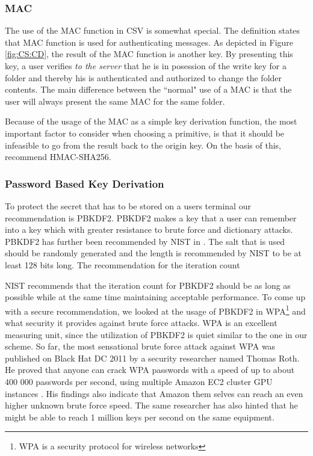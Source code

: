 \documentclass[pdftex,english,10pt,b5paper,twoside]{book}
\begin{document}
\subsubsection{\ac{MAC}}
The use of the \ac{MAC} function in \ac{CSV} is somewhat special. The
definition states that MAC function is used for authenticating messages.  As
depicted in Figure \ref{fig:CS:CD}, the result of the \ac{MAC} function is
another key. By presenting this key, a user verifies \emph{to the server} that
he is in posession of the write key for a folder and thereby his is
authenticated and authorized to change the folder contents. The main difference
between the ``normal" use of a \ac{MAC} is that the user will always present
the same \ac{MAC} for the same folder.

Because of the usage of the \ac{MAC} as a simple key derivation function, the
most important factor to consider when choosing a primitive, is that it should
be infeasible to go from the result back to the origin key. On the basis of
this, \citet{schneier} recommend HMAC-SHA256.

\subsubsection{Password Based Key Derivation} 

To protect the secret that has to be stored on a users terminal our
recommendation is \ac{PBKDF2}. \ac{PBKDF2} makes a key that a user can remember
into a key which with greater resistance to brute force and dictionary attacks.
\ac{PBKDF2} has further been recommended by \ac{NIST} in \cite{pbkdf_nist}.
The salt that is used should be randomly generated and the length is
recommended by \ac{NIST} to be at least 128 bits long. The recommendation for
the iteration count 

\ac{NIST} recommends that the iteration count for \ac{PBKDF2} should be as long
as possible while at the same time maintaining acceptable
performance\cite{pbkdf_nist}. To come up with a secure recommendation, we
looked at the usage of \ac{PBKDF2} in WPA\footnote{WPA is a security protocol
for wireless networks} and what security it provides against brute force
attacks. WPA is an excellent measuring unit, since the utilization of
\ac{PBKDF2} is quiet similar to the one in our scheme. So far, the most
sensational brute force attack against WPA was published on Black Hat DC 2011
by a security researcher named Thomas Roth. He proved that anyone can crack WPA
passwords with a speed of up to about 400 000 passwords per second, using
multiple Amazon \ac{EC2} cluster \ac{GPU} instances \cite{rothwpa}. His
findings also indicate that Amazon them selves can reach an even higher unknown
brute force speed. The same researcher has also hinted that he might be able to
reach 1 million keys per second on the same equipment\cite{rothblog}.
\end{document}
